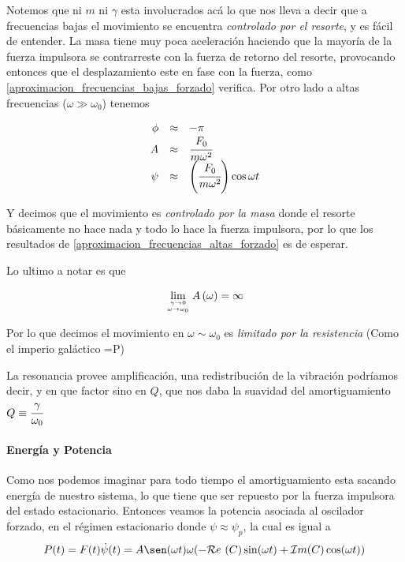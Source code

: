 \documentclass[a4paper,spanish]{article}
\def\Rea {\mathcal{R}e}
\def\Ima {\mathcal{I}m}
\numberwithin{equation}{section}
\begin{document}
Notemos que ni $m$ ni $\gamma$ esta involucrados ac\'a lo que nos lleva a decir que a frecuencias bajas el movimiento se encuentra \textit{controlado por el resorte}, y es f\'acil de entender. La masa tiene muy poca aceleraci\'on haciendo que la mayor\'ia de la fuerza impulsora se contrarreste con la fuerza de retorno del resorte, provocando entonces que el desplazamiento este en fase con la fuerza, como \ref{aproximacion_frecuencias_bajas_forzado} verifica. Por otro lado a altas frecuencias ($\omega\gg\omega_0$) tenemos

\begin{equation}
\begin{array}{rcl}
\phi & \approx & -\pi \\
A & \approx & \cfrac{F_0}{m\omega^2}\\
\psi & \approx & \left(\cfrac{F_0}{m \omega^2}\right) \cos{\omega t}
\end{array}
\label{aproximacion_frecuencias_altas_forzado}
\end{equation}

Y decimos que el movimiento es \textit{controlado por la masa} donde el resorte b\'asicamente no hace nada y todo lo hace la fuerza impulsora, por lo que los resultados de \ref{aproximacion_frecuencias_altas_forzado} es de esperar.

Lo ultimo a notar es que 

\[\lim_{{\gamma \rightarrow 0}\atop{\omega \rightarrow \omega_0}} A \left(\omega\right) = \infty \]

Por lo que decimos el movimiento en $\omega \sim \omega_0$ es \textit{limitado por la resistencia} (Como el imperio gal\'actico =P)

La resonancia provee amplificaci\'on, una redistribuci\'on de la vibraci\'on podr\'iamos decir, y en que factor sino en $Q$, que nos daba la suavidad del amortiguamiento $Q\equiv \cfrac{\gamma}{\omega_0}$

\paragraph{Energ\'ia y Potencia}
Como nos podemos imaginar para todo tiempo el amortiguamiento esta sacando energ\'ia de nuestro sistema, lo que tiene que ser repuesto por la fuerza impulsora del estado estacionario. Entonces veamos la potencia asociada al oscilador forzado, en el r\'egimen estacionario donde $\psi \approx \psi_p$, la cual es igual a 
	\begin{equation}
		P(t) = F(t) \dot{\psi}(t) = A \sen(\omega t) \omega (- \Rea \ (C) \sin(\omega t) + \Ima(C) \cos(\omega t))
		\label{eq:oscilador_forzado_potencia_t}
	\end{equation}
	
\end{document}
